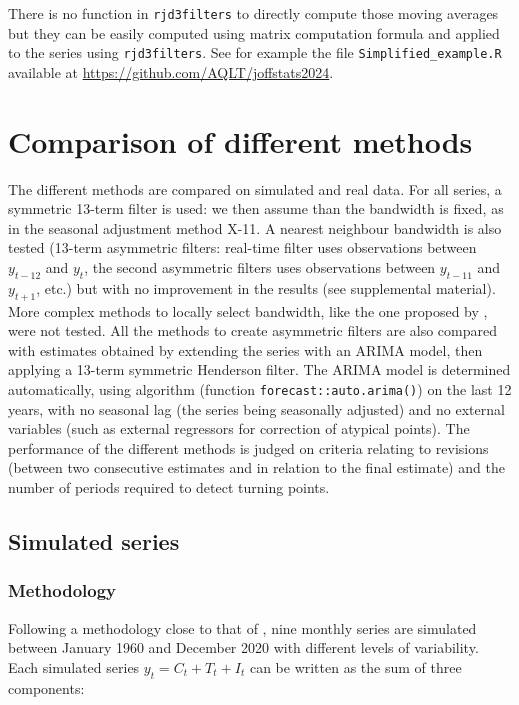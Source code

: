 \documentclass[
]{article}
\newcommand\1{\mathds{1}}
\begin{document}
There is no function in \texttt{rjd3filters} to directly compute those
moving averages but they can be easily computed using matrix computation
formula and applied to the series using \texttt{rjd3filters}. See for
example the file \texttt{Simplified\_example.R} available at
\url{https://github.com/AQLT/joffstats2024}.

\section{Comparison of different methods}\label{sec-comparison}

The different methods are compared on simulated and real data. For all
series, a symmetric 13-term filter is used: we then assume than the
bandwidth is fixed, as in the seasonal adjustment method X-11. A nearest
neighbour bandwidth is also tested (13-term asymmetric filters:
real-time filter uses observations between \(y_{t-12}\) and \(y_{t}\),
the second asymmetric filters uses observations between \(y_{t-11}\) and
\(y_{t+1}\), etc.) but with no improvement in the results (see
supplemental material). More complex methods to locally select
bandwidth, like the one proposed by \textcite{fan1992variable}, were not
tested. All the methods to create asymmetric filters are also compared
with estimates obtained by extending the series with an ARIMA model,
then applying a 13-term symmetric Henderson filter. The ARIMA model is
determined automatically, using \textcite{autoarima} algorithm (function
\texttt{forecast::auto.arima()}) on the last 12 years, with no seasonal
lag (the series being seasonally adjusted) and no external variables
(such as external regressors for correction of atypical points). The
performance of the different methods is judged on criteria relating to
revisions (between two consecutive estimates and in relation to the
final estimate) and the number of periods required to detect turning
points.

\subsection{Simulated series}\label{simulated-series}

\subsubsection{Methodology}\label{methodology}

Following a methodology close to that of \textcite{DarneDagum2009}, nine
monthly series are simulated between January 1960 and December 2020 with
different levels of variability. Each simulated series
\(y_t= C_t+ T_t + I_t\) can be written as the sum of three components:
\end{document}
